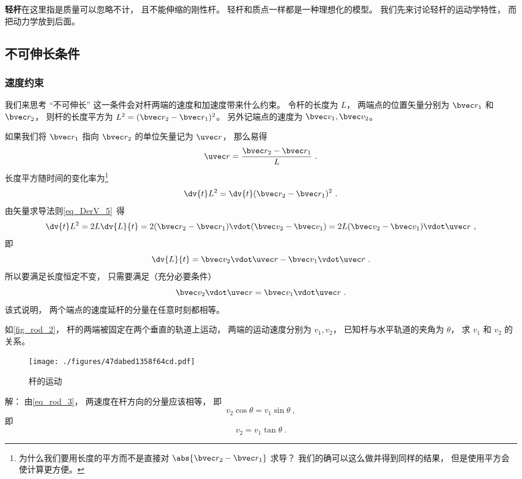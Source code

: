 

\textbf{轻杆}在这里指是质量可以忽略不计， 且不能伸缩的刚性杆。 轻杆和质点一样都是一种理想化的模型。 我们先来讨论轻杆的运动学特性， 而把动力学放到后面。

\subsection{不可伸长条件}
\subsubsection{速度约束}
我们来思考 “不可伸长” 这一条件会对杆两端的速度和加速度带来什么约束。 令杆的长度为 $L$， 两端点的位置矢量分别为 $\bvec r_1$ 和 $\bvec r_2$， 则杆的长度平方为 $L^2 = (\bvec r_2 - \bvec r_1)^2$。 另外记端点的速度为 $\bvec v_1, \bvec v_2$。

如果我们将 $\bvec r_1$ 指向 $\bvec r_2$ 的单位矢量记为 $\uvec r$， 那么易得
\begin{equation}\label{eq_rod_7}
\uvec r = \frac{\bvec r_2 - \bvec r_1}{L}~.
\end{equation}
长度平方随时间的变化率为\footnote{为什么我们要用长度的平方而不是直接对 $\abs{\bvec r_2 - \bvec r_1}$ 求导？ 我们的确可以这么做并得到同样的结果， 但是使用平方会使计算更方便。}
\begin{equation}\label{eq_rod_2}
\dv{t} L^2 = \dv{t} (\bvec r_2 - \bvec r_1)^2~.
\end{equation}
由矢量求导法则\autoref{eq_DerV_5}~得
\begin{equation}\label{eq_rod_1}
\dv{t} L^2 = 2L \dv{L}{t} = 2 (\bvec r_2 - \bvec r_1) \vdot (\bvec v_2 - \bvec v_1) = 2L (\bvec v_2 - \bvec v_1) \vdot \uvec r~,
\end{equation}
即
\begin{equation}\label{eq_rod_6}
\dv{L}{t} = \bvec v_2 \vdot \uvec r - \bvec v_1 \vdot \uvec r~.
\end{equation}
所以要满足长度恒定不变， 只需要满足（充分必要条件）
\begin{equation}\label{eq_rod_3}
\bvec v_2 \vdot \uvec r = \bvec v_1 \vdot \uvec r~.
\end{equation}
该式说明， 两个端点的速度延杆的分量在任意时刻都相等。

\begin{example}{}\label{ex_rod_1}
如\autoref{fig_rod_2}， 杆的两端被固定在两个垂直的轨道上运动， 两端的运动速度分别为 $v_1, v_2$， 已知杆与水平轨道的夹角为 $\theta$， 求 $v_1$ 和 $v_2$ 的关系。
\begin{figure}[ht]
\centering
\texttt{[image: ./figures/47dabed1358f64cd.pdf]}
\caption{杆的运动} \label{fig_rod_1}
\end{figure}
解： 由\autoref{eq_rod_3}， 两速度在杆方向的分量应该相等， 即
\begin{equation}
v_2 \cos\theta = v_1 \sin\theta~,
\end{equation}
即
\begin{equation}
v_2 = v_1 \tan\theta~.
\end{equation}
\end{example}

